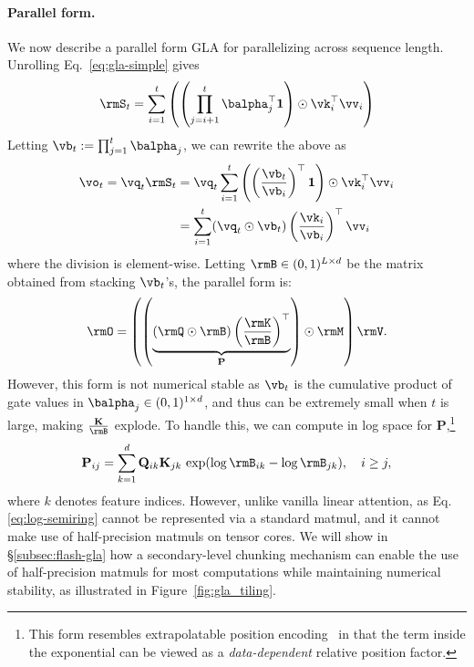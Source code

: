 \paragraph{Parallel form.} 
We now describe a parallel form GLA for parallelizing across sequence length. Unrolling Eq.~\ref{eq:gla-simple} gives
\begin{equation*}
\rmS_t = \sum_{i=1}^{t} \left(\left(\prod_{j=i+1}^{t}\balpha_{j}^{\top}\mathbf{1}\right) \odot \vk_i^{\top} \vv_i \right)    
\label{eq:gla_parallel}
\end{equation*}
Letting $\vb_t := \prod_{j=1}^{t} \balpha_j$, we can rewrite the above as 
\begin{align*}
\vo_t = \vq_t \rmS_t &= \vq_t \sum_{i=1}^{t} \left( \left(\frac{\vb_t}{\vb_i} \right)^{\top} \mathbf{1} \right) \odot \vk_i^{\top} \vv_i \\ &= \sum_{i=1}^{t}(\vq_t \odot \vb_t) \left(\frac{\vk_i}{\vb_i}\right)^{\top} \vv_i
\end{align*}
where the division is element-wise. Letting $\rmB \in (0,1)^{L \times d}$ be the matrix obtained from stacking $\vb_t$'s,  the parallel form is:
\begin{equation*}
\rmO = \left(\left(\underbrace{(\rmQ \odot \rmB) \left(\frac{\rmK}{\rmB}\right)^{\top}}_{\mathbf{P}} \right) \odot \rmM \right) \rmV.
\label{eq:parallel_gla}
\end{equation*}
However, this form is not numerical stable as $\vb_t$  is the cumulative product of gate values in $\balpha_j \in (0, 1)^{1 \times d}$, and thus can be extremely small when $t$ is large, making $ \frac{\mathbf{K}}{\rmB}$ explode. To handle this, we can compute in log space for $\mathbf{P}$,\footnote{This form resembles extrapolatable position encoding~\citep{xpos} in that the term inside the exponential can be viewed as a  \textit{data-dependent} relative position factor. }
\begin{align}
    \vspace{-6mm}
    \mathbf{P}_{ij} = \sum_{k=1}^{d} \mathbf{Q}_{ik} \mathbf{K}_{jk} \, \exp(\log \rmB_{ik}-\log\rmB_{jk}), \quad i \ge j,
    \label{eq:log-semiring}
    \vspace{-6mm}
\end{align}
where $k$ denotes feature indices. 
However, unlike vanilla linear attention, as Eq. \ref{eq:log-semiring} cannot be represented via a standard matmul, and it cannot make use of half-precision matmuls on tensor cores. We will show in \S\ref{subsec:flash-gla} how a secondary-level chunking mechanism can enable the use of half-precision matmuls for most computations while maintaining numerical stability, as illustrated in Figure~\ref{fig:gla_tiling}.

